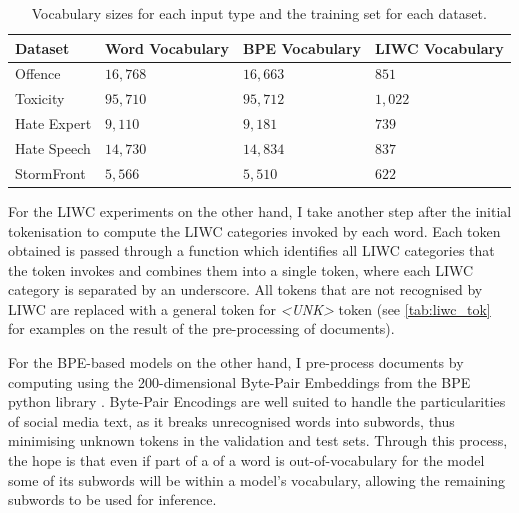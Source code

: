 \begin{table}[]
\centering
\begin{tabular}{llll}
Dataset     & Word Vocabulary & BPE Vocabulary & LIWC Vocabulary \\\hline
Offence     & $16,768$        & $16,663$       & $851$           \\
Toxicity    & $95,710$        & $95,712$       & $1,022$         \\
Hate Expert & $9,110$         & $9,181$        & $739$           \\
Hate Speech & $14,730$        & $14,834$       & $837$           \\
StormFront  & $5,566$         & $5,510$        & $622$
\end{tabular}
\caption{Vocabulary sizes for each input type and the training set for each dataset.}
\label{tab:vocab_sizes}
\end{table}

For the LIWC experiments on the other hand, I take another step after the initial tokenisation to compute the LIWC categories invoked by each word. Each token obtained is passed through a function which identifies all LIWC categories that the token invokes and combines them into a single token, where each LIWC category is separated by an underscore. All tokens that are not recognised by LIWC are replaced with a general token for \textit{<UNK>} token (see \cref{tab:liwc_tok} for examples on the result of the pre-processing of documents).

For the BPE-based models on the other hand, I pre-process documents by computing using the 200-dimensional Byte-Pair Embeddings from the BPE python library \citep{Heinzerling:2018}. Byte-Pair Encodings are well suited to handle the particularities of social media text, as it breaks unrecognised words into subwords, thus minimising unknown tokens in the validation and test sets. Through this process, the hope is that even if part of a of a word is out-of-vocabulary for the model some of its subwords will be within a model's vocabulary, allowing the remaining subwords to be used for inference.

\begin{table}
  \centering
  \caption{Word token and BPE representation.}
  \label{tab:bpe_tok}
\end{table}

